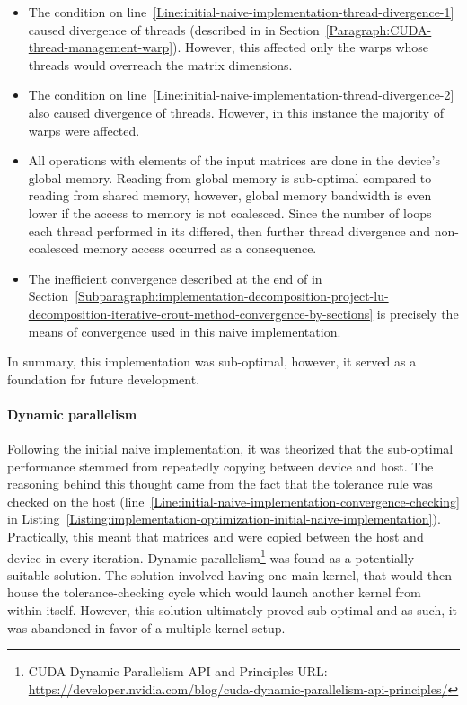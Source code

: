 \begin{itemize}
	\item The condition on line~\ref{Line:initial-naive-implementation-thread-divergence-1} caused divergence of threads (described in \textit{} in Section~\ref{Paragraph:CUDA-thread-management-warp}). However, this affected only the warps whose threads would overreach the matrix dimensions.
	\item The condition on line~\ref{Line:initial-naive-implementation-thread-divergence-2} also caused divergence of threads. However, in this instance the majority of warps were affected.
	\item All operations with elements of the input matrices are done in the device's global memory. Reading from global memory is sub-optimal compared to reading from shared memory, however, global memory bandwidth is even lower if the access to memory is not coalesced. Since the number of loops each thread performed in its  differed, then further thread divergence and non-coalesced memory access occurred as a consequence.
	\item The inefficient convergence described at the end of \textit{} in Section~\ref{Subparagraph:implementation-decomposition-project-lu-decomposition-iterative-crout-method-convergence-by-sections} is precisely the means of convergence used in this naive implementation.
\end{itemize}

In summary, this implementation was sub-optimal, however, it served as a foundation for future development.

\paragraph{Dynamic parallelism}\label{Paragraph:implementation-optimization-dynamic-parallelism}
Following the initial naive implementation, it was theorized that the sub-optimal performance stemmed from repeatedly copying between device and host. The reasoning behind this thought came from the fact that the tolerance rule was checked on the host (line~\ref{Line:initial-naive-implementation-convergence-checking} in Listing~\ref{Listing:implementation-optimization-initial-naive-implementation}). Practically, this meant that matrices  and  were copied between the host and device in every iteration. Dynamic parallelism\footnote{CUDA Dynamic Parallelism API and Principles URL: \url{https://developer.nvidia.com/blog/cuda-dynamic-parallelism-api-principles/}} was found as a potentially suitable solution. The solution involved having one main kernel, that would then house the tolerance-checking  cycle which would launch another kernel from within itself. However, this solution ultimately proved sub-optimal and as such, it was abandoned in favor of a multiple kernel setup. 

